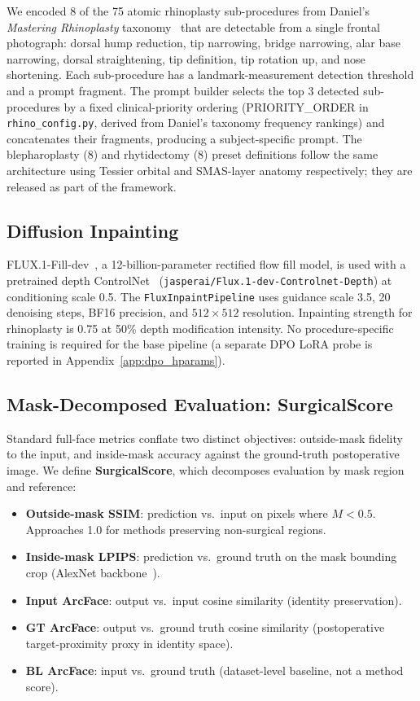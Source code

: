 \documentclass{article}
\begin{document}
We encoded 8 of the 75 atomic rhinoplasty sub-procedures from Daniel's
\emph{Mastering Rhinoplasty} taxonomy~\citep{daniel2010mastering} that are
detectable from a single frontal photograph: dorsal hump reduction, tip
narrowing, bridge narrowing, alar base narrowing, dorsal straightening,
tip definition, tip rotation up, and nose shortening. Each sub-procedure has a landmark-measurement detection threshold
and a prompt fragment. The prompt builder selects the top 3 detected
sub-procedures by a fixed clinical-priority ordering (PRIORITY\_ORDER in \texttt{rhino\_config.py}, derived from Daniel's taxonomy frequency rankings) and concatenates their fragments,
producing a subject-specific prompt. The blepharoplasty (8) and
rhytidectomy (8) preset definitions follow the same architecture using
Tessier orbital and SMAS-layer anatomy respectively; they are released as part of the
framework.

\subsection{Diffusion Inpainting}

FLUX.1-Fill-dev~\citep{flux2024}, a 12-billion-parameter rectified flow fill model, is
used with a pretrained depth ControlNet~\citep{zhang2023controlnet}
(\texttt{jasperai/Flux.1-dev-Controlnet-Depth}) at conditioning scale 0.5.
The \texttt{FluxInpaintPipeline} uses guidance scale 3.5, 20 denoising steps,
BF16 precision, and $512 \times 512$ resolution. Inpainting strength for
rhinoplasty is 0.75 at 50\% depth modification intensity. No procedure-specific
training is required for the base pipeline (a separate DPO LoRA probe is reported in Appendix~\ref{app:dpo_hparams}).

\subsection{Mask-Decomposed Evaluation: SurgicalScore}
\label{sec:eval_metric}

Standard full-face metrics conflate two distinct objectives: outside-mask
fidelity to the input, and inside-mask accuracy against the ground-truth
postoperative image. We define \textbf{SurgicalScore}, which decomposes
evaluation by mask region and reference:
\begin{itemize}
\item \textbf{Outside-mask SSIM}: prediction vs.\ input on pixels where
  $M < 0.5$. Approaches 1.0 for methods preserving non-surgical regions.
\item \textbf{Inside-mask LPIPS}: prediction vs.\ ground truth on the mask
  bounding crop (AlexNet backbone~\citep{zhang2018lpips}).
\item \textbf{Input ArcFace}: output vs.\ input cosine similarity (identity
  preservation).
\item \textbf{GT ArcFace}: output vs.\ ground truth cosine similarity (postoperative target-proximity proxy in identity space).
\item \textbf{BL ArcFace}: input vs.\ ground truth (dataset-level baseline,
  not a method score).
\end{itemize}
\end{document}
